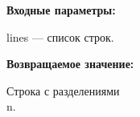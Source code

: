 \textbf{Входные параметры:}
 
lines --- список строк.

\textbf{Возвращаемое значение:}

Строка с разделениями \\n.